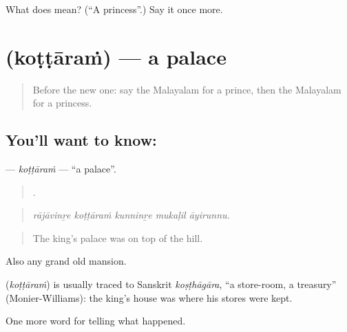 \begin{tcolorbox}[breakable,colback=teal!4,colframe=teal!35!black,title={Before you move on}]
What does  mean? (\textquotedblleft{}A princess\textquotedblright{}.) Say it once more.
\end{tcolorbox}
\section[\texorpdfstring{\ml{കൊട്ടാരം} (koṭṭāraṁ)}{കൊട്ടാരം (koṭṭāraṁ)}]{ (koṭṭāraṁ) — a palace}

\label{lesson:ML-C397-kottaram}



\begin{quote}
Before the new one: say the Malayalam for a prince, then the Malayalam for a princess.
\end{quote}

\subsection*{You'll want to know: }
\textbf{} — \emph{koṭṭāraṁ} — \textquotedblleft{}a palace\textquotedblright{}.

\begin{quote}
    .
\end{quote}

\begin{quote}
\emph{rājāvinṟe koṭṭāraṁ kunninṟe mukaḷil āyirunnu.}
\end{quote}

\begin{quote}
The king's palace was on top of the hill.
\end{quote}

Also any grand old mansion.

\begin{cousinweb}
\textbf{} (\emph{koṭṭāraṁ}) is usually traced to Sanskrit \emph{koṣṭhāgāra}, \textquotedblleft{}a store-room, a treasury\textquotedblright{} (Monier-Williams): the king's house was where his stores were kept.
\end{cousinweb}

\begin{grammarlens}[title={What you've built}]
One more word for telling what happened.
\end{grammarlens}

